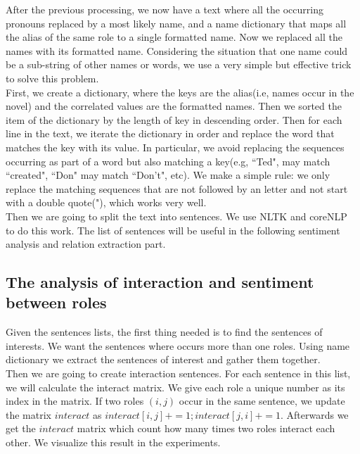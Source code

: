\documentclass[11pt]{article}
\begin{document}
After the previous processing, we now have a text where all the occurring pronouns replaced by a most likely name, and a name dictionary that maps all the alias of the same role to a single formatted name. Now we replaced all the names with its formatted name. Considering the situation that one name could be a sub-string of other names or words, we use a very simple but effective trick to solve this problem. \\
First, we create a dictionary, where the keys are the alias(i.e, names occur in the novel) and the correlated values are the formatted names. Then we sorted the item of the dictionary by the length of key in descending order. Then for each line in the text, we iterate the dictionary in order and replace the word that matches the key with its value. In particular, we avoid replacing the sequences occurring as part of a word but also matching a key(e.g, ``Ted", may match ``created", ``Don" may match ``Don't", etc). We make a simple rule: we only replace the matching sequences that are not followed by an letter and not start with a double quote("), which works very well. \\ 

Then we are going to split the text into sentences. We use NLTK\cite{Loper02nltk:the} and coreNLP~\cite{corenlp} to do this work. The list of sentences will be useful in the following sentiment analysis and relation extraction part.

\subsection{The analysis of interaction and sentiment between roles} %
Given the sentences lists, the first thing needed is to find the sentences of interests. We want the sentences where occurs more than one roles. Using name dictionary we extract the sentences of interest and gather them together. \\

Then we are going to create interaction sentences. For each sentence in this list, we will calculate the interact matrix. We give each role a unique number as its index in the matrix. If two roles $(i, j)$ occur in the same sentence, we update the matrix $interact$ as $interact[i, j] += 1; interact[j, i] += 1$. Afterwards we get the $interact$ matrix which count how many times two roles interact each other. We visualize this result in the experiments.\\
\end{document}

